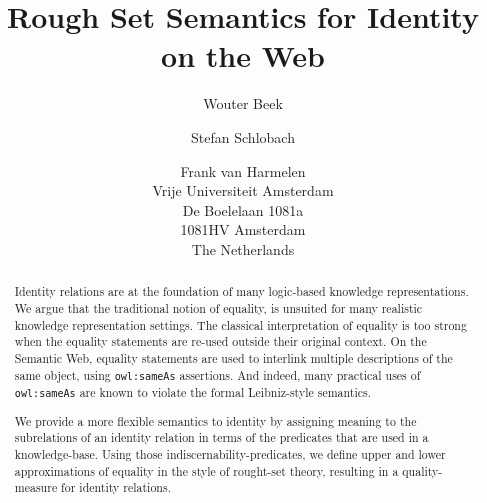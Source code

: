 \documentclass[letterpaper]{article}
\author{
  Wouter Beek \and Stefan Schlobach \and Frank van Harmelen\\
  Vrije Universiteit Amsterdam\\
  De Boelelaan 1081a\\
  1081HV Amsterdam\\
  The Netherlands
}
\title{Rough Set Semantics for Identity on the Web}
\begin{document}
\maketitle
\begin{abstract}
Identity relations are at the foundation of many
  logic-based knowledge representations.
We argue that the traditional notion of equality,
  is unsuited for many realistic knowledge representation settings.
The classical interpretation of equality is too strong
  when the equality statements are re-used outside their original context.
On the Semantic Web, equality statements are used to interlink
  multiple descriptions of the same object,
  using {\small \texttt{owl:sameAs}} assertions.
And indeed, many practical uses of {\small \texttt{owl:sameAs}}
  are known to violate the formal Leibniz-style semantics.

We provide a more flexible semantics to identity by assigning meaning to
  the subrelations of an identity relation
  in terms of the predicates that are used in a knowledge-base.
Using those indiscernability-predicates,
  we define upper and lower approximations of equality in the style of
  rought-set theory, resulting in a quality-measure for
  identity relations.
\end{abstract}








\end{document}

